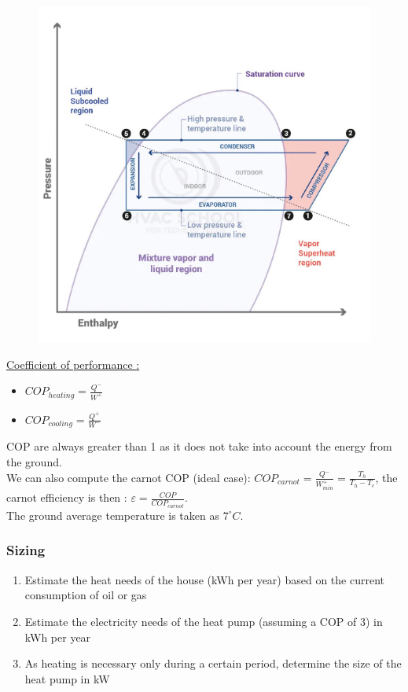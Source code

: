 \documentclass[../main.tex]{subfiles}
\begin{document}
\begin{figure}[hbt!]
    \centering
    \includegraphics[width=0.6\linewidth]{IMAGES/LCA/Screenshot from 2024-11-04 11-32-23.png}
\end{figure}

\quad \underline{Coefficient of performance :}\\
\begin{itemize}
    \item $COP_{heating} = \frac{Q^-}{W^+}$
    \item $COP_{cooling} = \frac{Q^+}{W^-}$
\end{itemize}
COP are always greater than 1 as it does not take into account the energy from the ground.\\

We can also compute the carnot COP (ideal case): $COP_{carnot} = \frac{Q^-}{W^+_{min}} = \frac{T_h}{T_h-T_c}$, the carnot efficiency is then : $\varepsilon = \frac{COP}{COP_{carnot}}$.\\

\warning The ground average temperature is taken as $7^\circ C$.\\

\subsubsection{Sizing}
\begin{enumerate}
    \item Estimate the heat needs of the house (kWh per year) based on the current consumption of oil or gas
    \item Estimate the electricity needs of the heat pump (assuming a COP of 3) in kWh per year
    \item As heating is necessary only during a certain period, determine the size of the heat pump in kW
\end{enumerate}
\end{document}
